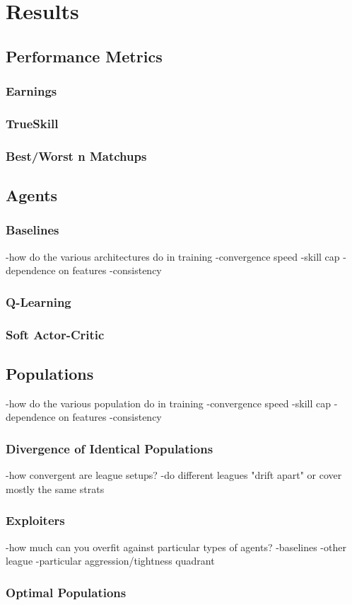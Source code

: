 \chapter{Results}

\section{Performance Metrics}

\subsection{Earnings}

\subsection{TrueSkill}

\subsection{Best/Worst n Matchups}


\section{Agents}

\subsection{Baselines}

-how do the various architectures do in training
    -convergence speed
    -skill cap
    -dependence on features
    -consistency

\subsection{Q-Learning}

\subsection{Soft Actor-Critic}


\section{Populations}
-how do the various population do in training
    -convergence speed
    -skill cap
    -dependence on features
    -consistency

\subsection{Divergence of Identical Populations}
-how convergent are league setups?
    -do different leagues "drift apart" or cover mostly the same strats

\subsection{Exploiters}
-how much can you overfit against particular types of agents?
    -baselines
    -other league
    -particular aggression/tightness quadrant

\subsection{Optimal Populations}